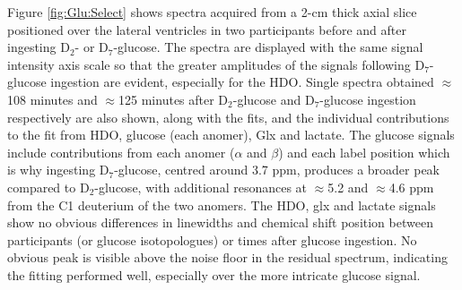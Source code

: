 Figure \ref{fig:Glu:Select} shows spectra acquired from a 2-cm thick axial slice positioned over the lateral ventricles in two participants before and after ingesting D$_2$- or D$_7$-glucose. The spectra are displayed with the same signal intensity axis scale so that the greater amplitudes of the signals following D$_7$-glucose ingestion are evident, especially for the \ac{HDO}. Single spectra obtained $\approx$108 minutes and $\approx$125 minutes after D$_2$-glucose and D$_7$-glucose ingestion respectively are also shown, along with the fits, and the individual contributions to the fit from \ac{HDO}, glucose (each anomer), Glx and lactate. The glucose signals include contributions from each anomer ($\alpha$ and $\beta$) and each label position which is why ingesting D$_7$-glucose, centred around 3.7 ppm, produces a broader peak compared to D$_2$-glucose, with additional resonances at $\approx$5.2 and $\approx$4.6 ppm from the C1 deuterium of the two anomers. The \ac{HDO}, glx and lactate signals show no obvious differences in linewidths and chemical shift position between participants (or glucose isotopologues) or times after glucose ingestion. No obvious peak is visible above the noise floor in the residual spectrum, indicating the fitting performed well, especially over the more intricate glucose signal.

